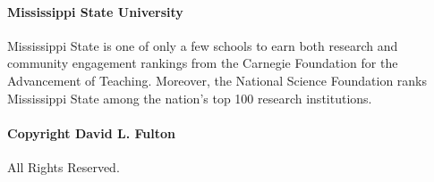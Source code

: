 \documentclass[fleqn,12pt]{SelfArx} %
\begin{document}
\begin{spacing}{1}
\paragraph{Mississippi State University}Mississippi State is one of only a few schools to earn both research and 
community engagement rankings from the Carnegie Foundation for the Advancement of Teaching. Moreover, the National Science Foundation ranks Mississippi State among the nation’s top 100 research institutions. 

\paragraph{Copyright \textsuperscript{\textregistered} \the\year \space David L. Fulton} All Rights Reserved.
\end{spacing}
\end{document}
